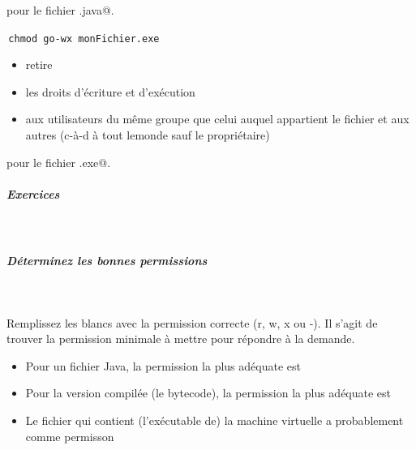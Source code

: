 \documentclass[11pt,a4paper]{article}
\begin{document}
          pour le fichier \verb@monFichier.java@.
        
            \par
        \,\verb|chmod go-wx monFichier.exe|\,
					\begin{itemize}
				
			\item retire
			\item les droits d'\'ecriture et d'ex\'ecution
			\item aux utilisateurs du m\^eme groupe que celui auquel appartient le fichier et aux autres (c-\`a-d \`a tout lemonde sauf le propri\'etaire)
					\end{itemize}
				
          pour le fichier \verb@monFichier.exe@.
        
            \par
        
			
		\subparagraph{Exercices} 
		
					\textcolor{white}{.} \par
				
            \par
        
			
		\subparagraph{D\'eterminez les bonnes permissions} 
		
                \textcolor{white}{.} \par
              
							Remplissez les blancs avec la permission correcte (r, w, x ou -). 
							Il s'agit de trouver la permission minimale \`a mettre pour r\'epondre \`a la demande.   
						
					\begin{itemize}
				
			\item 
									Pour un fichier Java, la permission la plus ad\'equate est
									 \textcolor{gray}{\underline{\hspace*{1em}}}  \textcolor{gray}{\underline{\hspace*{1em}}}  \textcolor{gray}{\underline{\hspace*{1em}}} 
			\item 
									Pour la version compil\'ee (le bytecode), la permission la plus ad\'equate est
									 \textcolor{gray}{\underline{\hspace*{1em}}}  \textcolor{gray}{\underline{\hspace*{1em}}}  \textcolor{gray}{\underline{\hspace*{1em}}} 
			\item 
									Le fichier qui contient (l'ex\'ecutable de) la machine virtuelle a probablement comme permisson
									 \textcolor{gray}{\underline{\hspace*{1em}}}  \textcolor{gray}{\underline{\hspace*{1em}}}  \textcolor{gray}{\underline{\hspace*{1em}}} 
					\end{itemize}
				
\end{document}

